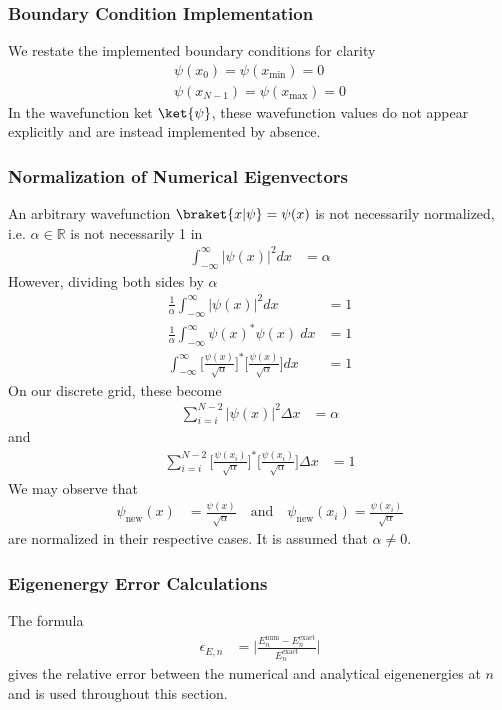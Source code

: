 \subsubsection{Boundary Condition Implementation}

We restate the implemented boundary conditions for clarity
\begin{align*}
    \psi(x_0) = \psi(x_\text{min}) = 0 \\
    \psi(x_{N-1}) = \psi(x_\text{max}) = 0
\end{align*}
%
In the wavefunction ket $\ket{\psi}$, these wavefunction values do not appear explicitly and are instead implemented by absence.

\subsubsection{Normalization of Numerical Eigenvectors}

An arbitrary wavefunction $\braket{x|\psi} = \psi(x)$ is not necessarily normalized, i.e. $\alpha \in \mathbb{R}$ is not necessarily 1 in
\begin{align*}
    \int_{-\infty}^{\infty} |\psi(x)|^2 dx &= \alpha
\end{align*}
%
However, dividing both sides by $\alpha$
\begin{align*}
    \frac{1}{\alpha} \int_{-\infty}^{\infty} |\psi(x)|^2 dx &= 1 \\
    \frac{1}{\alpha} \int_{-\infty}^{\infty} \psi(x)^*\psi(x) \ dx &= 1 \\
    \int_{-\infty}^{\infty} \Big[\frac{\psi(x)}{\sqrt{\alpha}}\Big]^*\Big[\frac{\psi(x)}{\sqrt{\alpha}}\Big] dx &= 1
\end{align*}
%
On our discrete grid, these become
\begin{align*}
    \sum_{i=i}^{N-2} |\psi(x)|^2 \Delta x &= \alpha
\end{align*}
%
and
\begin{align*}
    \sum_{i=i}^{N-2} \Big[\frac{\psi(x_i)}{\sqrt{\alpha}}\Big]^*\Big[\frac{\psi(x_i)}{\sqrt{\alpha}}\Big] \Delta x &= 1
\end{align*}
%
We may observe that
\begin{align*}
    \psi_\text{new}(x) &= \frac{\psi(x)}{\sqrt{\alpha}} \quad \text{and} \quad \psi_\text{new}(x_i) = \frac{\psi(x_i)}{\sqrt{\alpha}}
\end{align*}
%
are normalized in their respective cases. It is assumed that $\alpha \neq 0$.

\subsubsection{Eigenenergy Error Calculations}
%
The formula
\begin{align*}
    \epsilon_{E,n} &= \Big|\frac{E_n^\text{num} - E_n^\text{exact}}{E_n^\text{exact}}\Big|
\end{align*}
gives the relative error between the numerical and analytical eigenenergies at $n$ and is used throughout this section.

